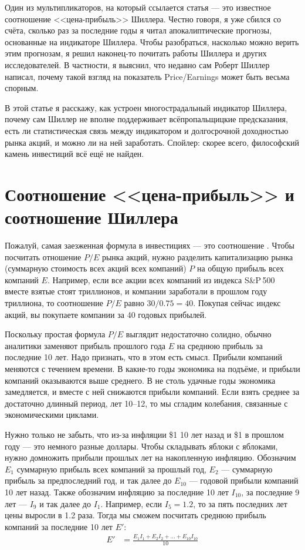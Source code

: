 Один из мультипликаторов, на который ссылается статья --- это известное соотношение <<цена-прибыль>> Шиллера. Честно говоря, я уже сбился со счёта, сколько раз за последние годы я читал апокалиптические прогнозы, основанные на индикаторе Шиллера. Чтобы разобраться, насколько можно верить этим прогнозам, я решил наконец-то почитать работы Шиллера и других исследователей. В частности, я выяснил, что недавно сам Роберт Шиллер написал, почему такой взгляд на показатель Price/Earnings может быть весьма спорным.

В этой статье я расскажу, как устроен многострадальный индикатор Шиллера, почему сам Шиллер не вполне поддерживает всёпропальщицкие предсказания, есть ли статистическая связь между индикатором и долгосрочной доходностью рынка акций, и можно ли на ней заработать. Спойлер: скорее всего, философский камень инвестиций всё ещё не найден.

\section*{Соотношение <<цена-прибыль>> и соотношение Шиллера}

Пожалуй, самая заезженная формула в инвестициях --- это соотношение . Чтобы посчитать отношение $P/E$ рынка акций, нужно разделить капитализацию рынка (суммарную стоимость всех акций всех компаний) $P$ на общую прибыль всех компаний $E$. Например, если все акции всех компаний из индекса S\&P\,500 вместе взятые стоят  триллионов, и компании заработали в прошлом году  триллиона, то соотношение $P/E$ равно $30/0.75 = 40$. Покупая сейчас индекс акций, вы покупаете компании за 40 годовых прибылей.

Поскольку простая формула $P/E$ выглядит недостаточно солидно, обычно аналитики заменяют прибыль прошлого года $E$ на среднюю прибыль за последние 10 лет. Надо признать, что в этом есть смысл. Прибыли компаний меняются с течением времени. В какие-то годы экономика на подъёме, и прибыли компаний оказываются выше среднего. В не столь удачные годы экономика замедляется, и вместе с ней снижаются прибыли компаний. Если взять среднее за достаточно длинный период, лет 10--12, то мы сгладим колебания, связанные с экономическими циклами.

Нужно только не забыть, что из-за инфляции \$1 10 лет назад и \$1 в прошлом году --- это немного разные доллары. Чтобы складывать яблоки с яблоками, нужно домножить прибыли прошлых лет на накопленную инфляцию. Обозначим $E_{1}$ суммарную прибыль всех компаний за прошлый год, $E_2$ --- суммарную прибыль за предпоследний год, и так далее до $E_{10}$ --- годовой прибыли компаний 10 лет назад. Также обозначим инфляцию за последние 10 лет $I_{10}$, за последние 9 лет --- $I_9$ и так далее до $I_1$. Например, если $I_5=1.2$, то за пять последних лет цены выросли в 1.2 раза. Тогда мы сможем посчитать среднюю прибыль компаний за последние 10 лет  $E'$:
\begin{align*}
E' &= \frac{E_1I_1 + E_2I_2 + ... + E_{10}I_{10}}{10}
\end{align*}

